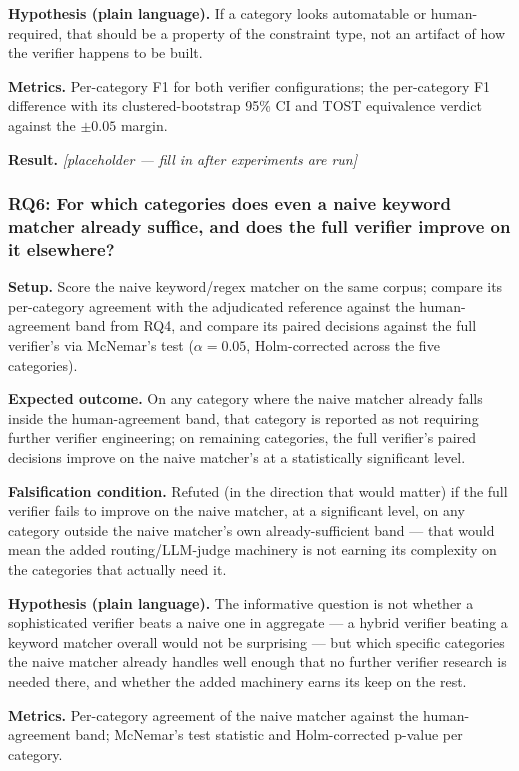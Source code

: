 \documentclass[11pt]{article}
\newcommand{\ph}{\textit{[placeholder --- fill in after experiments are run]}}
\begin{document}
\textbf{Hypothesis (plain language).} If a category looks automatable or human-required, that should be a property of the constraint type, not an artifact of how the verifier happens to be built.

\textbf{Metrics.} Per-category F1 for both verifier configurations; the per-category F1 difference with its clustered-bootstrap 95\% CI and TOST equivalence verdict against the $\pm 0.05$ margin.

\textbf{Result.} \ph

\subsubsection{RQ6: For which categories does even a naive keyword matcher already suffice, and does the full verifier improve on it elsewhere?}
\textbf{Setup.} Score the naive keyword/regex matcher on the same corpus; compare its per-category agreement with the adjudicated reference against the human-agreement band from RQ4, and compare its paired decisions against the full verifier's via McNemar's test ($\alpha = 0.05$, Holm-corrected across the five categories).

\textbf{Expected outcome.} On any category where the naive matcher already falls inside the human-agreement band, that category is reported as not requiring further verifier engineering; on remaining categories, the full verifier's paired decisions improve on the naive matcher's at a statistically significant level.

\textbf{Falsification condition.} Refuted (in the direction that would matter) if the full verifier fails to improve on the naive matcher, at a significant level, on any category outside the naive matcher's own already-sufficient band --- that would mean the added routing/LLM-judge machinery is not earning its complexity on the categories that actually need it.

\textbf{Hypothesis (plain language).} The informative question is not whether a sophisticated verifier beats a naive one in aggregate --- a hybrid verifier beating a keyword matcher overall would not be surprising --- but which specific categories the naive matcher already handles well enough that no further verifier research is needed there, and whether the added machinery earns its keep on the rest.

\textbf{Metrics.} Per-category agreement of the naive matcher against the human-agreement band; McNemar's test statistic and Holm-corrected p-value per category.
\end{document}
